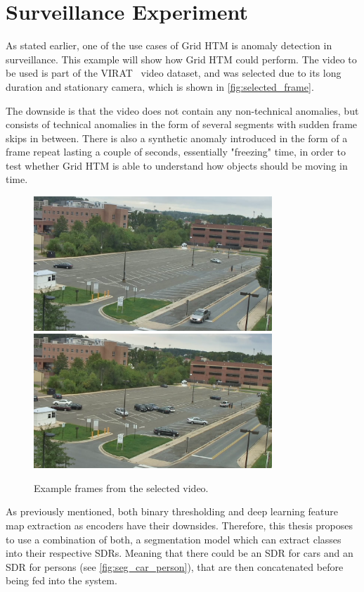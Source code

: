 \section{Surveillance Experiment}
As stated earlier, one of the use cases of Grid HTM is anomaly detection in surveillance. This example will show how Grid HTM could perform.
The video to be used is part of the VIRAT~\cite{VIRAT} video dataset, and was selected due to its long duration and stationary camera, which is shown in \autoref{fig:selected_frame}.
\par
The downside is that the video does not contain any non-technical anomalies, but consists of technical anomalies in the form of several segments with sudden frame skips in between. There is also a synthetic anomaly introduced in the form of a frame repeat lasting a couple of seconds, essentially "freezing" time, in order to test whether Grid HTM is able to understand how objects should be moving in time.
\begin{figure}[H]
    \centering
    \includegraphics[width=0.8\textwidth]{resources/methodology/original.png}
    \includegraphics[width=0.8\textwidth]{resources/experiments/surveillance/parking_frame.png}
    \caption[Example Frames]{Example frames from the selected video.}
    \label{fig:selected_frame}
\end{figure}
As previously mentioned, both binary thresholding and deep learning feature map extraction as encoders have their downsides. Therefore, this thesis proposes to use a combination of both, a segmentation model which can extract classes into their respective SDRs. Meaning that there could be an SDR for cars and an SDR for persons (see \autoref{fig:seg_car_person}), that are then concatenated before being fed into the system.
